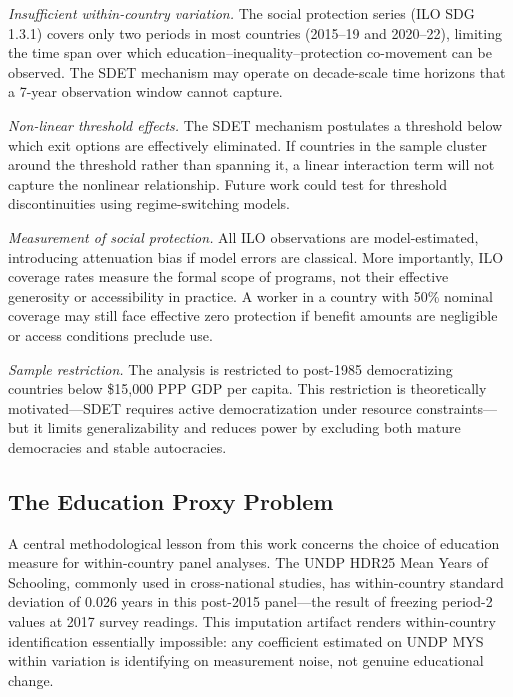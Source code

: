 \documentclass[11pt,letterpaper]{article}
\begin{document}
\emph{Insufficient within-country variation.} The social protection series (ILO SDG 1.3.1) covers
only two periods in most countries (2015--19 and 2020--22), limiting the time span over which
education--inequality--protection co-movement can be observed. The SDET mechanism may operate on
decade-scale time horizons that a 7-year observation window cannot capture.

\emph{Non-linear threshold effects.} The SDET mechanism postulates a threshold below which exit
options are effectively eliminated. If countries in the sample cluster around the threshold rather
than spanning it, a linear interaction term will not capture the nonlinear relationship. Future
work could test for threshold discontinuities using regime-switching models.

\emph{Measurement of social protection.} All ILO observations are model-estimated, introducing
attenuation bias if model errors are classical. More importantly, ILO coverage rates measure the
formal scope of programs, not their effective generosity or accessibility in practice. A worker in
a country with 50\% nominal coverage may still face effective zero protection if benefit amounts
are negligible or access conditions preclude use.

\emph{Sample restriction.} The analysis is restricted to post-1985 democratizing countries below
\$15{,}000 PPP GDP per capita. This restriction is theoretically motivated---SDET requires active
democratization under resource constraints---but it limits generalizability and reduces power by
excluding both mature democracies and stable autocracies.

\subsection{The Education Proxy Problem}

A central methodological lesson from this work concerns the choice of education measure for
within-country panel analyses. The UNDP HDR25 Mean Years of Schooling, commonly used in
cross-national studies, has within-country standard deviation of 0.026 years in this post-2015
panel---the result of freezing period-2 values at 2017 survey readings. This imputation artifact
renders within-country identification essentially impossible: any coefficient estimated on UNDP MYS
within variation is identifying on measurement noise, not genuine educational change.
\end{document}
